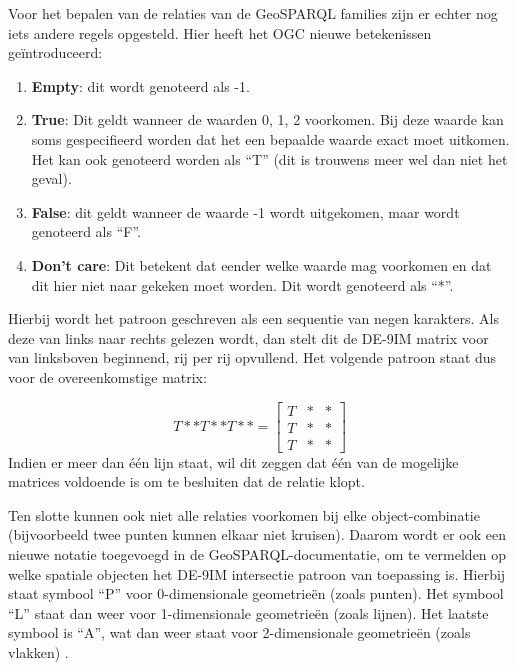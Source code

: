 Voor het bepalen van de relaties van de GeoSPARQL families zijn er echter nog iets andere regels opgesteld. Hier heeft het OGC nieuwe betekenissen geïntroduceerd: 
\begin{enumerate}
    \item \textbf{Empty}: dit wordt genoteerd als -1.
    \item \textbf{True}: Dit geldt wanneer de waarden 0, 1, 2 voorkomen. Bij deze waarde kan soms gespecifieerd worden dat het een bepaalde waarde exact moet uitkomen. Het kan ook genoteerd worden als ``T'' (dit is trouwens meer wel dan niet het geval).
    \item \textbf{False}: dit geldt wanneer de waarde -1 wordt uitgekomen, maar wordt genoteerd als ``F''.
    \item \textbf{Don't care}: Dit betekent dat eender welke waarde mag voorkomen en dat dit hier niet naar gekeken moet worden. Dit wordt genoteerd als ``*''.
\end{enumerate}
Hierbij wordt het patroon geschreven als een sequentie van negen karakters. Als deze van links naar rechts gelezen wordt, dan stelt dit de DE-9IM matrix voor van linksboven beginnend, rij per rij opvullend. Het volgende patroon staat dus voor de overeenkomstige matrix:

\begin{equation*}
    T**T**T** = 
    \begin{bmatrix}
    T & * & *\\
    T & * & *\\
    T & * & *
    \end{bmatrix}
\end{equation*}
Indien er meer dan één lijn staat, wil dit zeggen dat één van de mogelijke matrices voldoende is om te besluiten dat de relatie klopt.

Ten slotte kunnen ook niet alle relaties voorkomen bij elke object-combinatie (bijvoorbeeld twee punten kunnen elkaar niet kruisen). Daarom wordt er ook een nieuwe notatie toegevoegd in de GeoSPARQL-documentatie, om te vermelden op welke spatiale objecten het DE-9IM intersectie patroon van toepassing is. Hierbij staat symbool ``P'' voor 0-dimensionale geometrieën (zoals punten). Het symbool ``L'' staat dan weer voor 1-dimensionale geometrieën (zoals lijnen). Het laatste symbool is ``A'', wat dan weer staat voor 2-dimensionale geometrieën (zoals vlakken) \cite{ogcdocs}.


